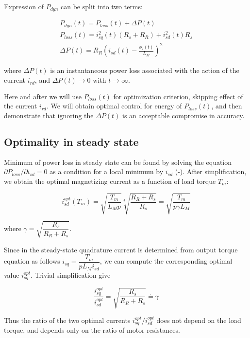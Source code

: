 \documentclass[journal]{IEEEtran}
\begin{document}
Expression of $P_{dyn}$ can be split into two terms:

\begin{equation}
\begin{gathered}
P_{dyn}(t) = P_{loss}(t) + \Delta P(t) \\
P_{loss}(t) = i_{sq}^2(t) (R_s + R_R) + i_{sd}^2(t) R_s \\
\Delta P(t) = R_R \left ( i_{sd}(t) - \frac{\phi_r(t)}{L_M} \right )^2
\end{gathered}
\end{equation}

where $\Delta P(t)$ is an instantaneous power loss associated with the action of the current $i_{rd}$, and $\Delta P(t) \to 0$ with $t \to \infty$.

Here and after we will use $P_{loss}(t)$ for optimization criterion, skipping effect of the current $i_{rd}$. We will obtain optimal control for energy of $P_{loss}(t)$, and then demonstrate that ignoring the $\Delta P(t)$ is an acceptable compromise in accuracy.

\subsection{Optimality in steady state}

Minimum of power loss in steady state can be found by solving the equation $\partial P_{loss} / \partial i_{sd} = 0$ as a condition for a local minimum by $i_{sd}$ (\cite{1}-\cite{2}). After simplification, we obtain the optimal magnetizing current as a function of load torque $T_m$:

\begin{equation}\label{eq:i_sd_opt_ss}
i_{sd}^{opt}(T_m) = \sqrt{\frac{T_m}{L_M p}} \sqrt[4]{\frac{R_R + R_s}{R_s}} = \sqrt{\frac{T_m}{p \gamma L_M}}
\end{equation}

where $\gamma = \sqrt{\dfrac{R_s}{R_R + R_s}}$.

Since in the steady-state quadrature current is determined from output torque equation as follows $i_{sq} = \dfrac {T_m} {p L_M i_{sd}}$, we can compute the corresponding optimal value $i_{sq}^{opt}$. Trivial simplification give

\begin{equation}\label{eq:gamma}
\frac{i_{sq}^{opt}}{i_{sd}^{opt}} = \sqrt{\frac{R_s}{R_R + R_s}} \doteq \gamma
\end{equation}

Thus the ratio of the two optimal currents $i_{sq}^{opt} / i_{sd}^{opt}$ does not depend on the load torque, and depends only on the ratio of motor resistances.
\end{document}
